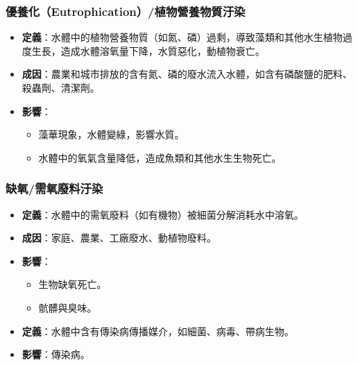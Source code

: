 \documentclass[a4paper,12pt]{report}
\begin{document}
\begin{itemize}
\subsubsection{優養化（Eutrophication）/植物營養物質汙染}
\begin{itemize}
    \item \textbf{定義}：水體中的植物營養物質（如氮、磷）過剩，導致藻類和其他水生植物過度生長，造成水體溶氧量下降，水質惡化，動植物衰亡。
    \item \textbf{成因}：農業和城市排放的含有氮、磷的廢水流入水體，如含有磷酸鹽的肥料、殺蟲劑、清潔劑。
    \item \textbf{影響}：
    \begin{itemize}
        \item 藻華現象，水體變綠，影響水質。
        \item 水體中的氧氣含量降低，造成魚類和其他水生生物死亡。
    \end{itemize}
\end{itemize}
\subsubsection{缺氧/需氧廢料汙染}
\begin{itemize}
    \item \textbf{定義}：水體中的需氧廢料（如有機物）被細菌分解消耗水中溶氧。
    \item \textbf{成因}：家庭、農業、工廠廢水、動植物廢料。
    \item \textbf{影響}：
    \begin{itemize}
        \item 生物缺氧死亡。
        \item 骯髒與臭味。
    \end{itemize}
\end{itemize}
\begin{itemize}
    \item \textbf{定義}：水體中含有傳染病傳播媒介，如細菌、病毒、帶病生物。
    \item \textbf{影響}：傳染病。
\end{itemize}

\end{itemize}
\end{document}
